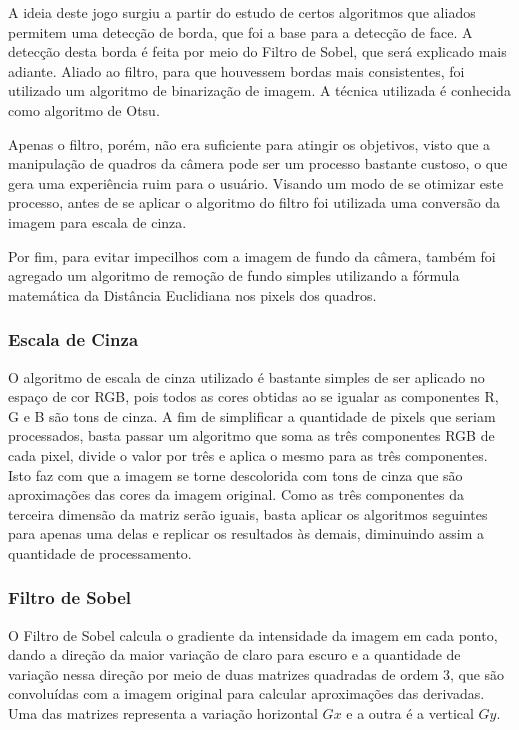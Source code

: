 \documentclass{sciposter}
\begin{document}
\begin{multicols}{3}
A ideia deste jogo surgiu a partir do estudo de certos algoritmos que aliados permitem uma detecção de borda, que foi a base para a detecção de face. A detecção desta borda é feita por meio do Filtro de Sobel, que será explicado mais adiante. Aliado ao filtro, para que houvessem bordas mais consistentes, foi utilizado um algoritmo de binarização de imagem. A técnica utilizada é conhecida como algoritmo de Otsu.

Apenas o filtro, porém, não era suficiente para atingir os objetivos, visto que a manipulação de quadros da câmera pode ser um processo bastante custoso, o que gera uma experiência ruim para o usuário. Visando um modo de se otimizar este processo, antes de se aplicar o algoritmo do filtro foi utilizada uma conversão da imagem para escala de cinza.

Por fim, para evitar impecilhos com a imagem de fundo da câmera, também foi agregado um algoritmo de remoção de fundo simples utilizando a fórmula matemática da Distância Euclidiana nos pixels dos quadros.

\subsubsection{Escala de Cinza}

O algoritmo de escala de cinza utilizado é bastante simples de ser aplicado no espaço de cor RGB, pois todos as cores obtidas ao se igualar as componentes R, G e B são tons de cinza. A fim de simplificar a quantidade de pixels que seriam processados, basta passar um algoritmo que soma as três componentes RGB de cada pixel, divide o valor por três e aplica o mesmo para as três componentes. Isto faz com que a imagem se torne descolorida com tons de cinza que são aproximações das cores da imagem original. Como as três componentes da terceira dimensão da matriz serão iguais, basta aplicar os algoritmos seguintes para apenas uma delas e replicar os resultados às demais, diminuindo assim a quantidade de processamento.

\subsubsection{Filtro de Sobel}

O Filtro de Sobel calcula o gradiente da intensidade da imagem em cada ponto, dando a direção da maior variação de claro para escuro e a quantidade de variação nessa direção por meio de duas matrizes quadradas de ordem 3, que são convoluídas com a imagem original para calcular aproximações das derivadas. Uma das matrizes representa a variação horizontal $Gx$ e a outra é a vertical $Gy$. \\


\end{multicols}
\end{document}
